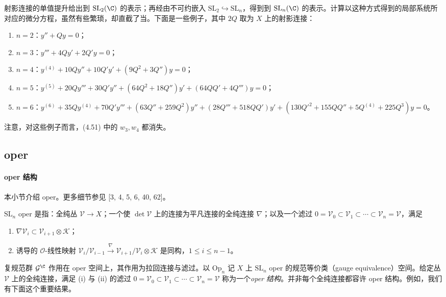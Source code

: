 \begin{example}
射影连接的单值提升给出到 $\mathrm{SL}_2(\C)$ 的表示；再经由不可约嵌入 $\mathrm{SL}_2\hookrightarrow\mathrm{SL}_n$，得到到 $\mathrm{SL}_n(\C)$ 的表示。计算以这种方式得到的局部系统所对应的微分方程，虽然有些繁琐，却直截了当。下面是一些例子，其中 $2Q$ 取为 $X$ 上的射影连接：
\begin{enumerate}[label=(\roman*),leftmargin=3em]
\item $n=2$：$y''+Qy=0$；
\item $n=3$：$y'''+4Qy'+2Q'y=0$；
\item $n=4$：$y^{(4)}+10Qy''+10Q'y'+(9Q^2+3Q'')y=0$；
\item $n=5$：$y^{(5)}+20Qy'''+30Q'y''+(64Q^2+18Q'')y'+(64QQ'+4Q''')y=0$；
\item $n=6$：$y^{(6)}+35Qy^{(4)}+70Q'y'''+(63Q''+259Q^2)y''+(28Q'''+518QQ')y'+(130Q'^2+155QQ''+5Q^{(4)}+225Q^3)y=0$。
\end{enumerate}
注意，对这些例子而言，(4.51) 中的 $w_3,w_4$ 都消失。
\end{example}

\subsection{oper}

\paragraph{oper 结构}
本小节介绍 oper。更多细节参见 [3, 4, 5, 6, 40, 62]。

\begin{definition}
$\mathrm{SL}_n$ oper 是指：全纯丛 $\mathcal{V}\to X$；一个使 $\det\mathcal{V}$ 上的连接为平凡连接的全纯连接 $\nabla$；以及一个滤过 $0=\mathcal{V}_0\subset\mathcal{V}_1\subset\cdots\subset\mathcal{V}_n=\mathcal{V}$，满足
\begin{enumerate}[label=(\roman*),leftmargin=3.2em]
\item $\nabla\mathcal{V}_i\subset\mathcal{V}_{i+1}\otimes\mathcal{K}$；
\item 诱导的 $\mathcal{O}$-线性映射 $\mathcal{V}_i/\mathcal{V}_{i-1}\xrightarrow{\ \nabla\ }\mathcal{V}_{i+1}/\mathcal{V}_i\otimes\mathcal{K}$ 是同构，$1\le i\le n-1$。
\end{enumerate}
\end{definition}

复规范群 $\mathcal{G}^\C$ 作用在 oper 空间上，其作用为拉回连接与滤过。以 $\mathrm{Op}_n$ 记 $X$ 上 $\mathrm{SL}_n$ oper 的规范等价类（gauge equivalence）空间。给定丛 $\mathcal{V}$ 上的全纯连接，满足 (i) 与 (ii) 的滤过 $0=\mathcal{V}_0\subset\mathcal{V}_1\subset\cdots\subset\mathcal{V}_n=\mathcal{V}$ 称为一个\emph{oper 结构}。并非每个全纯连接都容许 oper 结构。例如，我们有下面这个重要结果。

